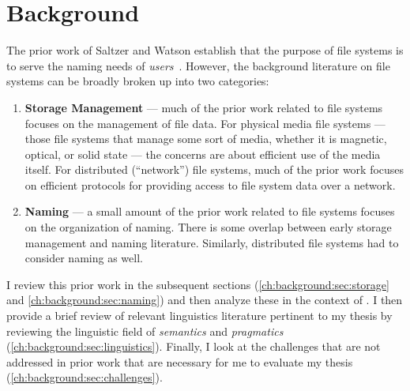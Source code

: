 \chapter{Background}
\label{ch:background}


The prior work of Saltzer and Watson establish that the purpose of file systems
is to serve the naming needs of
\emph{users}~\cite{Saltzer1978,watson1981identifiers}.   However, the background
literature on file systems can be broadly broken up into two categories:

\begin{enumerate}
    \item \textbf{Storage Management} --- much of the prior work related to file
          systems focuses on the management of file data.  For physical media file
          systems --- those file systems that manage some sort of media, whether it is
          magnetic, optical, or solid state --- the concerns are about efficient use
          of the media itself.  For distributed (``network'') file systems, much of
          the prior work focuses on efficient protocols for providing access to file
          system data over a network.

    \item \textbf{Naming} --- a small amount of the prior work related to file
          systems focuses on the organization of naming.  There is some overlap
          between early storage management and naming literature.  Similarly,
          distributed file systems had to consider naming as well.

\end{enumerate}

I review this prior work in the subsequent sections
(\autoref{ch:background:sec:storage} and \autoref{ch:background:sec:naming}) and
then analyze these in the context of \system.  I then provide a brief review of
relevant linguistics literature pertinent to my thesis by reviewing the
linguistic field of \emph{semantics} and \emph{pragmatics}
(\autoref{ch:background:sec:linguistics}). Finally, I look at
the challenges that are not addressed in prior work that are necessary for me to
evaluate my thesis (\autoref{ch:background:sec:challenges}).

